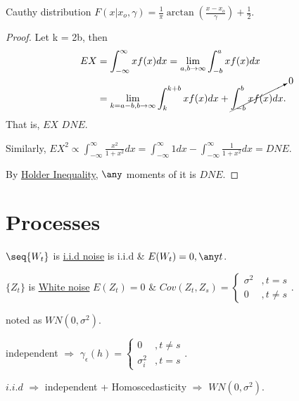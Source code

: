 \begin{example}
Cauthy distribution $F(x|x_o,\gamma) = \frac{1}{\pi} \arctan(\frac{x-x_o}{\gamma}) + \frac{1}{2}$.
\end{example}

\begin{proof}
Let k = 2b, then
\begin{align*}
    EX &= \int_{-\infty}^{\infty} xf(x) dx = \lim_{a,b\to \infty} \int_{-b}^{a} xf(x) dx \\
    &= \lim _{k=a-b,b\to\infty}\int_{k}^{k+b} xf(x)dx + \cancelto{0}{\int _{-b}^{b} xf(x) dx}.
\end{align*}
That is, $EX$ $DNE$.

Similarly, $EX^2 \propto \int_{-\infty}^{\infty} \frac{x^2}{1+x^2}dx = \int_{-\infty}^{\infty} 1 dx - \int_{-\infty}^{\infty} \frac{1}{1+x^2}dx = DNE$.

By \href{https://en.wikipedia.org/wiki/H\%C3\%B6lder\%27s_inequality}{Holder Inequality}, $\any$ moments of it is $DNE$.
\end{proof}

\section{Processes}

\begin{definition}
$\seq{W_t}$ is \uline{i.i.d noise} \iff {} is i.i.d \& $E(W_t) = 0, \any t$.
\end{definition}

\begin{definition}
$\{Z_t\}$ is \uline{White noise} \iff $E(Z_t) = 0$ \& $Cov(Z_t,Z_s) = 
\begin{cases}
\sigma^2 &, t=s\\
0 &, t \neq s
\end{cases}
$.

noted as $WN(0,\sigma^2)$.
\end{definition}

\begin{property}
\item independent $\Rightarrow$ $\gamma_\epsilon(h) = 
\begin{cases}
0 &, t \neq s\\
\sigma_i^2 &, t=s
\end{cases}
$.
\item $i.i.d$ $\Rightarrow$ independent + Homoscedasticity $\Rightarrow$ $WN(0,\sigma^2)$.
\begin{example}
\end{example}
\end{property}

